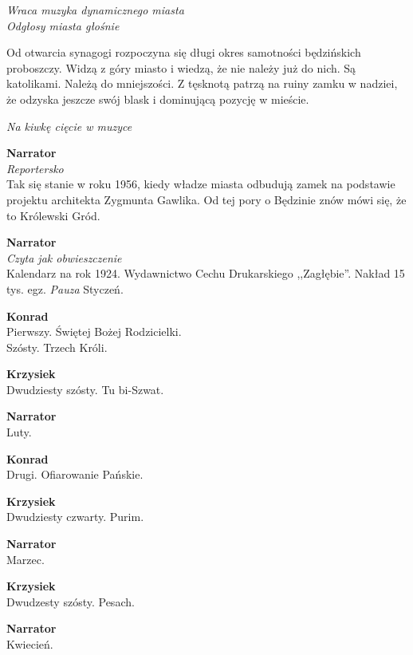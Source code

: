 \documentclass[11pt,a4paper,oneside]{article}
\begin{document}
{\color{light-gray} \emph{Wraca muzyka dynamicznego miasta}}\\
{\color{light-gray} \emph{Odgłosy miasta głośnie}}

Od otwarcia synagogi rozpoczyna się długi okres samotności będzińskich
proboszczy. Widzą z góry miasto i wiedzą, że nie należy już do nich.
Są katolikami. Należą do mniejszości. Z tęsknotą patrzą na ruiny zamku
w nadziei, że odzyska jeszcze swój blask i dominującą pozycję
w mieście. 

{\color{light-gray} \emph{Na kiwkę cięcie w muzyce}}

\textbf{Narrator}\\
{\color{light-gray} \emph{Reportersko}}\\
Tak się stanie w roku 1956, kiedy władze miasta odbudują zamek na
podstawie projektu architekta Zygmunta Gawlika. Od tej pory o Będzinie
znów mówi się, że to Królewski Gród.

\textbf{Narrator}\\
{\color{light-gray} \emph{Czyta jak obwieszczenie}}\\
Kalendarz na rok 1924. Wydawnictwo Cechu Drukarskiego ,,Zagłębie''.
Nakład 15 tys. egz. {\color{light-gray} \emph{Pauza}} Styczeń.

{\color{konrad}
\textbf{Konrad}\\
Pierwszy. Świętej Bożej Rodzicielki. \\
Szósty. Trzech Króli.
}

{\color{krzysiek}
\textbf{Krzysiek}\\
Dwudziesty szósty. Tu bi-Szwat. %
}

\textbf{Narrator}\\
Luty.

{\color{konrad}
\textbf{Konrad}\\
Drugi. Ofiarowanie Pańskie.
}

{\color{krzysiek}
\textbf{Krzysiek}\\
Dwudziesty czwarty. Purim.
}

\textbf{Narrator}\\
Marzec.

{\color{krzysiek}
\textbf{Krzysiek}\\
Dwudzesty szósty. Pesach.
}

\textbf{Narrator}\\
Kwiecień.
\end{document}
